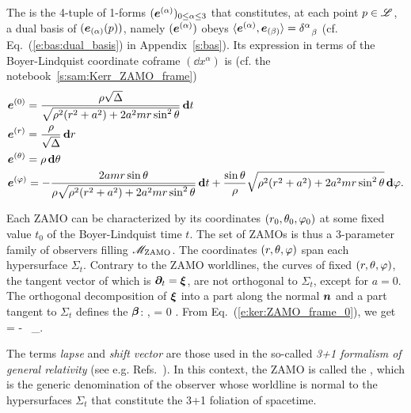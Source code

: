 The  is the 4-tuple of 1-forms
$(\bm{e}^{(\alpha)})_{0\leq \alpha\leq 3}$ that constitutes, at each point $p\in\mathscr{L}$, a dual basis of
$(\bm{e}_{(\alpha)}(p))$, namely $(\bm{e}^{(\alpha)})$ obeys
$\langle \bm{e}^{(\alpha)} , \bm{e}_{(\beta)} \rangle = \delta^\alpha_{\ \ \beta} $
(cf. Eq.~(\ref{e:bas:dual_basis}) in Appendix~\ref{s:bas}). Its expression in terms of the
Boyer-Lindquist coordinate coframe $(\dd x^\alpha)$ is (cf. the notebook~\ref{s:sam:Kerr_ZAMO_frame})
\begin{subequations}
\label{e:ker:def_ZAMO_coframe}
\begin{align}
  & \bm{e}^{(0)} =
  \frac{\rho\sqrt{\Delta}}{\sqrt{\rho^2(r^2 + a^2) + 2 a^2 m r \sin^2\theta}}\, \mathbf{d} t \\
  & \bm{e}^{(r)} = \frac{\rho}{\sqrt{\Delta}} \, \mathbf{d} r \\
  & \bm{e}^{(\theta)} = \rho\, \mathbf{d} \theta  \\
  & \bm{e}^{(\varphi)} = - \frac{2 a m r \sin\theta}{\rho\sqrt{\rho^2(r^2 + a^2) + 2 a^2 m r \sin^2\theta}} \, \mathbf{d} t
  + \frac{\sin\theta}{\rho} \sqrt{\rho^2(r^2 + a^2) + 2 a^2 m r \sin^2\theta} \, \mathbf{d}\varphi .
\end{align}
\end{subequations}


Each ZAMO can be characterized by its coordinates $(r_0,\theta_0,\varphi_0)$ at some fixed
value $t_0$ of the Boyer-Lindquist time $t$. The set of ZAMOs is thus a 3-parameter family of observers
filling $\mathscr{M}_{\rm ZAMO}$.
The coordinates $(r,\theta,\varphi)$ span each hypersurface $\Sigma_t$.
Contrary to the ZAMO worldlines, the curves of fixed $(r,\theta, \varphi)$, the tangent vector
of which is $\bm{\partial}_t = \bm{\xi}$, are not orthogonal to $\Sigma_t$, except for $a=0$. The orthogonal
decomposition of $\bm{\xi}$ into a part along the normal $\bm{n}$ and a part tangent to $\Sigma_t$
defines the  $\bm{\beta}$:
\be \label{e:ker:xi_3p1_ZAMO}
    , \qquad {}\cdot\w{\beta} = 0 .
\ee
From Eq.~(\ref{e:ker:ZAMO_frame_0}), we get
\be
    \w{\beta} = - \, \wpar_\ph .
\ee
\begin{remark}
The terms \emph{lapse} and \emph{shift vector} are those used in the so-called \emph{3+1 formalism
of general relativity}
(see e.g. Refs.~\cite{Alcub08,BaumgS10,Gourg12,Shiba15}). In this context, the ZAMO is called the
,
which is the generic denomination of the observer whose worldline is normal to
the hypersurfaces $\Sigma_t$ that constitute the 3+1 foliation of spacetime.
\end{remark}

